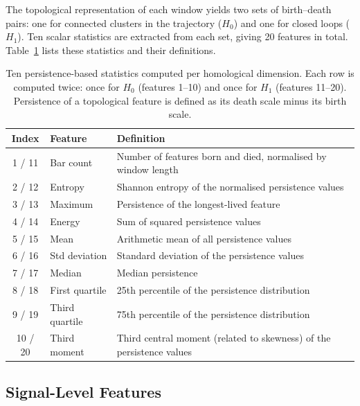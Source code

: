 \documentclass[onluarkali,ingilizce,yukseklisans,karton,LisansustuEgitim]{itutez}
\providecommand{\1}{\mathbf{1}}
\begin{document}
The topological representation of each window yields two sets of birth--death pairs: one for connected clusters in the trajectory ($H_0$) and one for closed loops ($H_1$). Ten scalar statistics are extracted from each set, giving 20 features in total. Table~\ref{tab:ph_features} lists these statistics and their definitions.

\begin{table}[h!]
\centering
\caption{Ten persistence-based statistics computed per homological dimension.
  Each row is computed twice: once for $H_0$ (features 1--10) and once for $H_1$
  (features 11--20).  Persistence of a topological feature is defined as its
  death scale minus its birth scale.}
\label{tab:ph_features}
\small
\begin{tabular}{clp{8cm}}
\toprule
\textbf{Index} & \textbf{Feature} & \textbf{Definition} \\
\midrule
1 / 11  & Bar count          & Number of features born and died, normalised by window length \\
2 / 12  & Entropy            & Shannon entropy of the normalised persistence values \\
3 / 13  & Maximum            & Persistence of the longest-lived feature \\
4 / 14  & Energy             & Sum of squared persistence values \\
5 / 15  & Mean               & Arithmetic mean of all persistence values \\
6 / 16  & Std deviation      & Standard deviation of the persistence values \\
7 / 17  & Median             & Median persistence \\
8 / 18  & First quartile     & 25th percentile of the persistence distribution \\
9 / 19  & Third quartile     & 75th percentile of the persistence distribution \\
10 / 20 & Third moment       & Third central moment (related to skewness) of the persistence values \\
\bottomrule
\end{tabular}
\end{table}

\subsection{Signal-Level Features}
\label{subsubsec:signal_features}
\end{document}
